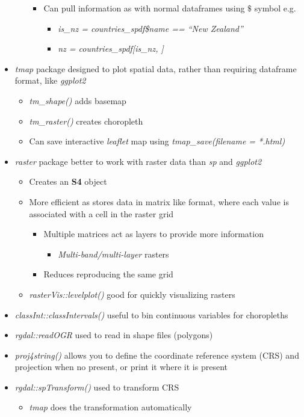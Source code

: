 \documentclass{article}
\begin{document}
\begin{itemize}
\begin{itemize}
\begin{itemize}
            \item Can pull information as with normal dataframes using $\$$ symbol e.g. 
            \begin{itemize}
                \item \textit{is\_nz = countries\_spdf\$name == ``New Zealand''}
                \item \textit{nz = countries\_spdf[is\_nz, ]}
            \end{itemize}
        \end{itemize}
    \end{itemize}
    \item \textit{tmap} package designed to plot spatial data, rather than requiring dataframe format, like \textit{ggplot2}
    \begin{itemize}
        \item \textit{tm\_shape()} adds basemap
        \item \textit{tm\_raster()} creates choropleth
        \item Can save interactive \textit{leaflet} map using \textit{tmap\_save(filename = *.html)}
    \end{itemize}
    \item \textit{raster} package better to work with raster data than \textit{sp} and \textit{ggplot2}
    \begin{itemize}
        \item Creates an \textbf{S4} object
        \item More efficient as stores data in matrix like format, where each value is associated with a cell in the raster grid
        \begin{itemize}
            \item Multiple matrices act as layers to provide more information
            \begin{itemize}
                \item \textit{Multi-band/multi-layer} rasters
            \end{itemize}
            \item Reduces reproducing the same grid
        \end{itemize}
        \item \textit{rasterVis::levelplot()} good for quickly visualizing rasters
    \end{itemize}
    \item \textit{classInt::classIntervals()} useful to bin continuous variables for choropleths
    \item \textit{rgdal::readOGR} used to read in shape files (polygons)
    \item \textit{proj4string()} allows you to define the coordinate reference system (CRS) and projection when no present, or print it where it is present
    \item \textit{rgdal::spTransform()} used to transform CRS
    \begin{itemize}
        \item \textit{tmap} does the transformation automatically
    \end{itemize}
\end{itemize}
\end{document}
